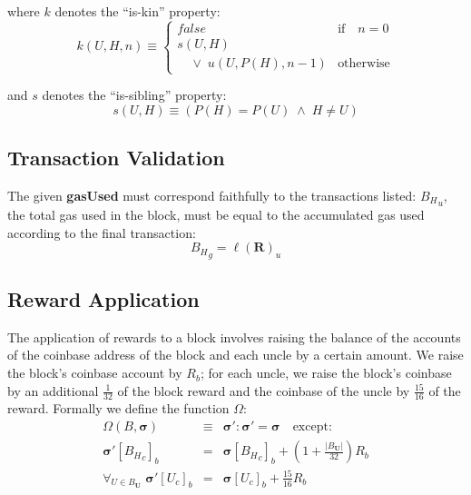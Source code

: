 \documentclass[9pt,oneside]{amsart}
\begin{document}
\begin{multicols}{2}
where $k$ denotes the ``is-kin'' property:
\begin{equation}
k(U, H, n) \equiv \begin{cases} false & \text{if} \quad n = 0 \\ 
s(U, H) &\\
\quad \vee \; u(U, P(H), n - 1) & \text{otherwise}
\end{cases}
\end{equation}

and $s$ denotes the ``is-sibling'' property:
\begin{equation}
s(U, H) \equiv (P(H) = P(U)\; \wedge \; H \neq U)
\end{equation}

\subsection{Transaction Validation}


The given \textbf{gasUsed} must correspond faithfully to the transactions listed: ${B_H}_u$, the total gas used in the block, must be equal to the accumulated gas used according to the final transaction:
\begin{equation}
{B_H}_g = \ell(\mathbf{R})_u
\end{equation}

\subsection{Reward Application}

The application of rewards to a block involves raising the balance of the accounts of the coinbase address of the block and each uncle by a certain amount. We raise the block's coinbase account by $R_b$; for each uncle, we raise the block's coinbase by an additional $\frac{1}{32}$ of the block reward and the coinbase of the uncle by $\frac{15}{16}$ of the reward. Formally we define the function $\Omega$:
\begin{eqnarray}
\Omega(B, \boldsymbol{\sigma}) & \equiv & \boldsymbol{\sigma}': \boldsymbol{\sigma}' = \boldsymbol{\sigma} \quad \text{except:} \\
\boldsymbol{\sigma}'[{B_H}_c]_b & = & \boldsymbol{\sigma}[{B_H}_c]_b + (1 + \frac{|B_\mathbf{U}|}{32})R_b \\
\forall_{U \in B_\mathbf{U}} \; \boldsymbol{\sigma}'[U_c]_b & = & \boldsymbol{\sigma}[U_c]_b + \frac{15}{16}R_b
\end{eqnarray}


\end{multicols}
\end{document}
